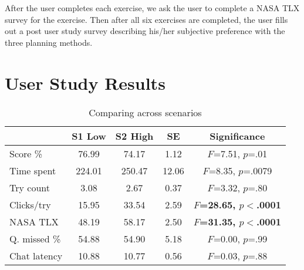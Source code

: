 After the user completes each exercise, we ask the user to complete a NASA TLX survey for the exercise. Then after all six exercises are completed, the user fills out a post user study survey describing his/her subjective preference with the three planning methods.

\section{User Study Results} 
\label{sec:AResults}



\begin{table}
\caption{Comparing across scenarios}
	\centering
		\begin{tabular}
			{|l|c|c|c|c|}
			\hline
			& S1 Low & S2 High & SE & Significance \\
			\hline
			Score \% & 76.99 & 74.17 & 1.12 & $F$=7.51, $p$=.01 \\
			Time spent & 224.01 & 250.47 & 12.06 & $F$=8.35, $p$=.0079 \\
			Try count & 3.08 & 2.67 & 0.37 & $F$=3.32, $p$=.80 \\
			Clicks/try	& 15.95 & 33.54 & 2.59 & \textbf{$F$=28.65, $p<$.0001} \\ 
			NASA TLX & 48.19 & 58.17 & 2.50 & \textbf{$F$=31.35, $p<$.0001} \\ 
			\hline
			Q. missed \% & 54.88 & 54.90 & 5.18 & $F$=0.00, $p$=.99 \\ 
			Chat latency & 10.88 & 10.77 & 0.56 & $F$=0.03, $p$=.88 \\ 
			\hline			
		\end{tabular}
\label{AAcrossScenarios}
\end{table}

